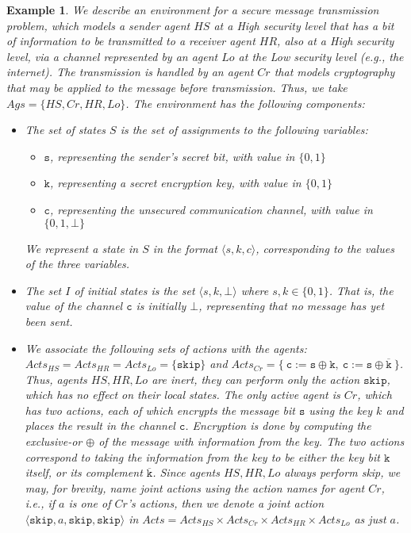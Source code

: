 \documentclass[a4wide]{article}
\theoremstyle{examplesty}
\newtheorem{example}{Example}
\newcommand{\Ags}{\mathit{Ags}}
\newcommand{\Acts}{\mathit{Acts}}
\newcommand{\Crypt}{Cr}
\newcommand{\Low}{Lo}
\begin{document}
\begin{example} \label{ex:environment} 
We describe an environment for a secure message transmission 
problem, which models a sender agent $HS$ at a High security level that has a bit of  information to be  transmitted 
to a receiver agent $HR$, also at a High security level, via a channel represented by an agent $\Low$ 
at the Low security level (e.g., the internet). The transmission is 
handled by an agent $\Crypt$ that models cryptography that may be applied to the message before transmission. 
Thus, we take $\Ags = \{HS,\Crypt, HR,\Low\}$. The environment has the following components: 
\begin{itemize}
\item The set of states $S$ is the set of assignments to the following variables: 
\begin{itemize} 
\item $\mathtt{s}$, representing the sender's secret bit, with value in $\{0,1\}$
\item $\mathtt{k}$, representing a secret encryption key, with value in $\{0,1\}$
\item $\mathtt{c}$, representing the unsecured communication channel, with value in $\{0,1,\bot\}$
\end{itemize} 
We represent a state in $S$ in the format $\langle s,k,c\rangle$, corresponding to the values of the three variables. 

\item The set $I$ of initial states is the set $\langle s, k, \bot\rangle $ where $s,k\in \{0,1\}$. 
That is, the value of the channel $\mathtt{c}$ is initially $\bot$, representing that no 
message has yet been sent.  

\item We associate the following sets of actions with the agents: 
$\Acts_{HS} = \Acts_{HR} = \Acts_{\Low} = \{ \mathtt{skip} \}$ and 
$\Acts_{\Crypt} = \{ ~\mathtt{c}:=\mathtt{s} \oplus \mathtt{k}, ~ \mathtt{c}:=\mathtt{s} \oplus \overline{\mathtt{k}}~\}$. 
Thus, agents $HS,HR, \Low$ are inert, they can perform only the action $ \mathtt{skip}$, which has
no effect on their local states. The only active agent is $\Crypt$, which 
has two actions, each of which encrypts the message bit $\mathtt{s}$ using the key $k$ and 
places the result in the channel $\mathtt{c}$. Encryption is done 
by computing the exclusive-or $\oplus$ of the message with information from the key. 
The two actions correspond to taking the information from the key to be either 
the key bit $\mathtt{k}$ itself, or its complement $\overline{\mathtt{k}}$. 
Since agents $HS, HR, \Low$ always perform skip, we may, for brevity,  name 
joint actions using the action names for agent $\Crypt$, 
i.e., if $a$ is one of $\Crypt$'s actions, then we denote a joint action $\langle \mathtt{skip}, a, \mathtt{skip}, \mathtt{skip}\rangle$ 
in $\Acts = \Acts_{HS}\times \Acts_{\Crypt}\times \Acts_{HR}\times \Acts_{\Low}$ as just $a$. 


\end{itemize}
\end{example}
\end{document}
